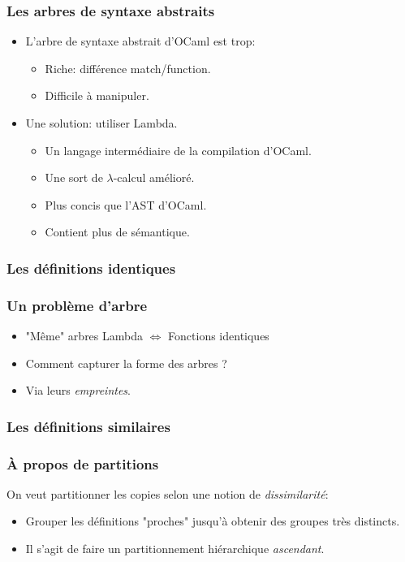 \documentclass[11pt]{beamer}
\begin{document}
\begin{frame}
\frametitle{Les arbres de syntaxe abstraits}
\begin{itemize}
\item L'arbre de syntaxe abstrait d'OCaml est trop:
	\begin{itemize}
		\item Riche: différence match/function.
		\item Difficile à manipuler.
	\end{itemize}
\pause
\item Une solution: \alert{utiliser Lambda}.
	\begin{itemize}
	\item Un langage intermédiaire de la compilation d'OCaml.
	\item Une sort de $\lambda$-calcul amélioré.
	\item Plus concis que l'AST d'OCaml.
	\item Contient plus de sémantique.
\end{itemize}
\end{itemize}
\end{frame}

\subsubsection{Les définitions identiques}
\begin{frame}
\frametitle{Un problème d'arbre}
\begin{itemize}
\item "Même" arbres Lambda $\iff$ Fonctions identiques
\item Comment capturer la forme des arbres ?
\pause
\item Via leurs \emph{empreintes}.
\end{itemize}
\end{frame}

\subsubsection{Les définitions similaires}
\begin{frame}
	\frametitle{À propos de partitions}
On veut partitionner les copies selon une notion de \emph{dissimilarité}:
\begin{itemize}
\item Grouper les définitions "proches" jusqu'à obtenir des groupes très distincts.
\item Il s'agit de faire un partitionnement hiérarchique \emph{ascendant}.
\end{itemize}
\end{frame}
\end{document}
